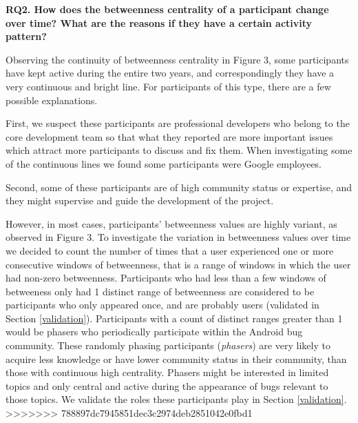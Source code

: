 \documentclass[conference]{IEEEtran}
\begin{document}
\textbf{RQ2. How does the betweenness centrality of a participant change over time? What are the reasons if they have a certain activity pattern?}

Observing the continuity of betweenness centrality in Figure 3, some
participants have kept active during the entire two years, and
correspondingly they have a very continuous and bright line. For
participants of this type, there are a few possible explanations. 

First, we suspect these participants are professional developers who
belong to the core development team so that what they reported are
more important issues which attract more participants to discuss and fix
them. 
When investigating some of the continuous lines we found some
participants were Google employees.

Second, some of these participants are of high community status or
expertise, and they might
supervise and guide the development of the 
project. 


However, in most cases, participants' betweenness values are
highly variant, as observed in Figure 3. 
To investigate the variation in betweenness values over time we
decided to count the number of times that a user experienced one or more
consecutive windows of betweenness, that is a range of windows in
which the user had non-zero betweenness.
Participants who had less than a few windows of betweeness only had 1
distinct range of betweenness are considered to be participants who
only appeared once, and are probably users (validated in Section \ref{validation}). 
Participants with a count of distinct ranges
 greater than 1 would be phasers who periodically participate within
 the Android bug
community. 
These randomly phasing participants (\emph{phasers}) are very likely to
acquire less knowledge or have lower community status in their
community, than those with continuous high centrality. 
Phasers
might be interested in limited topics and only central and active
during the appearance of bugs relevant to those topics.
We validate the roles these participants play in Section \ref{validation}.
>>>>>>> 788897dc7945851dec3c2974deb2851042e0fbd1
\end{document}

